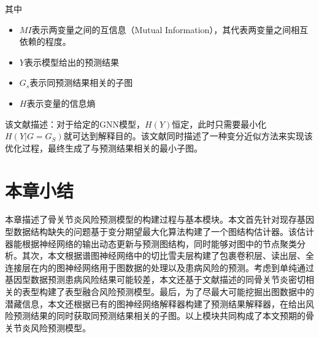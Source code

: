 其中

\begin{itemize}
\item
  \(MI\)表示两变量之间的互信息（Mutual
  Information），其代表两变量之间相互依赖的程度。
\item
  \(Y\)表示模型给出的预测结果
\item
  \(G_s\)表示同预测结果相关的子图
\item
  \(H\)表示变量的信息熵
\end{itemize}

该文献描述：对于给定的GNN模型，$H(Y)$恒定，此时只需要最小化$ H(Y|G=G_S)$就可达到解释目的。该文献同时描述了一种变分近似方法来实现该优化过程，最终生成了与预测结果相关的最小子图。

\section{本章小结}
本章描述了骨关节炎风险预测模型的构建过程与基本模块。本文首先针对现存基因型数据结构缺失的问题基于变分期望最大化算法构建了一个图结构估计器。该估计器能根据神经网络的输出动态更新与预测图结构，同时能够对图中的节点聚类分析。其次，本文根据谱图神经网络中的切比雪夫层构建了包裹卷积层、读出层、全连接层在内的图神经网络用于图数据的处理以及患病风险的预测。考虑到单纯通过基因型数据预测患病风险结果可能较差，本文还基于文献描述的同骨关节炎密切相关的表型构建了表型融合风险预测模型。最后，为了尽最大可能挖掘出图数据中的潜藏信息，本文还根据已有的图神经网络解释器构建了预测结果解释器，在给出风险预测结果的同时获取同预测结果相关的子图。以上模块共同构成了本文预期的骨关节炎风险预测模型。 